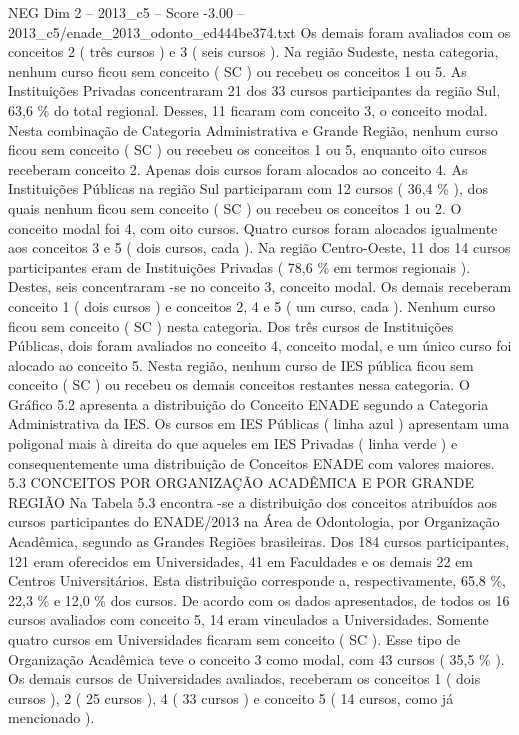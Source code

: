 \begin{textsample}{NEG Dim 2 – 2013\_c5 – Score -3.00 – 2013\_c5/enade\_2013\_odonto\_ed444be374.txt}
Os demais foram avaliados com os conceitos 2 ( três cursos ) e 3 ( seis cursos ).
Na região Sudeste, nesta categoria, nenhum curso ficou sem conceito ( SC ) ou recebeu os conceitos 1 ou 5.
As Instituições Privadas concentraram 21 dos 33 cursos participantes da região Sul, 63,6 \% do total regional.
Desses, 11 ficaram com conceito 3, o conceito modal.
Nesta combinação de Categoria Administrativa e Grande Região, nenhum curso ficou sem conceito ( SC ) ou recebeu os conceitos 1 ou 5, enquanto oito cursos receberam conceito 2.
Apenas dois cursos foram alocados ao conceito 4.
As Instituições Públicas na região Sul participaram com 12 cursos ( 36,4 \% ), dos quais nenhum ficou sem conceito ( SC ) ou recebeu os conceitos 1 ou 2.
O conceito modal foi 4, com oito cursos.
Quatro cursos foram alocados igualmente aos conceitos 3 e 5 ( dois cursos, cada ).
Na região Centro-Oeste, 11 dos 14 cursos participantes eram de Instituições Privadas ( 78,6 \% em termos regionais ).
Destes, seis concentraram -se no conceito 3, conceito modal.
Os demais receberam conceito 1 ( dois cursos ) e conceitos 2, 4 e 5 ( um curso, cada ).
Nenhum curso ficou sem conceito ( SC ) nesta categoria.
Dos três cursos de Instituições Públicas, dois foram avaliados no conceito 4, conceito modal, e um único curso foi alocado ao conceito 5.
Nesta região, nenhum curso de IES pública ficou sem conceito ( SC ) ou recebeu os demais conceitos restantes nessa categoria.
O Gráfico 5.2 apresenta a distribuição do Conceito ENADE segundo a Categoria Administrativa da IES.
Os cursos em IES Públicas ( linha azul ) apresentam uma poligonal mais à direita do que aqueles em IES Privadas ( linha verde ) e consequentemente uma distribuição de Conceitos ENADE com valores maiores. 5.3 CONCEITOS POR ORGANIZAÇÃO ACADÊMICA E POR GRANDE REGIÃO Na Tabela 5.3 encontra -se a distribuição dos conceitos atribuídos aos cursos participantes do ENADE/2013 na Área de Odontologia, por Organização Acadêmica, segundo as Grandes Regiões brasileiras.
Dos 184 cursos participantes, 121 eram oferecidos em Universidades, 41 em Faculdades e os demais 22 em Centros Universitários.
Esta distribuição corresponde a, respectivamente, 65,8 \%, 22,3 \% e 12,0 \% dos cursos.
De acordo com os dados apresentados, de todos os 16 cursos avaliados com conceito 5, 14 eram vinculados a Universidades.
Somente quatro cursos em Universidades ficaram sem conceito ( SC ).
Esse tipo de Organização Acadêmica teve o conceito 3 como modal, com 43 cursos ( 35,5 \% ).
Os demais cursos de Universidades avaliados, receberam os conceitos 1 ( dois cursos ), 2 ( 25 cursos ), 4 ( 33 cursos ) e conceito 5 ( 14 cursos, como já mencionado ).

\end{textsample}
